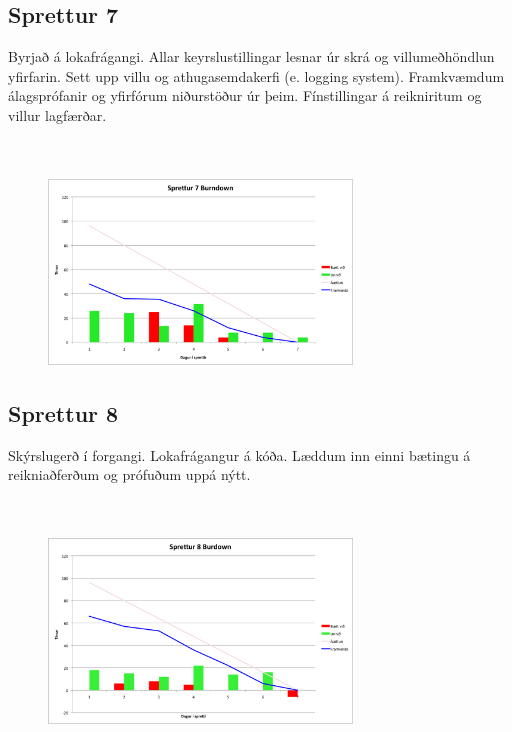 \documentclass{article}
\begin{document}
\subsection{Sprettur 7}
Byrjað á lokafrágangi. Allar keyrslustillingar lesnar úr skrá og villumeðhöndlun
yfirfarin. Sett upp villu og athugasemdakerfi (e. logging system). Framkvæmdum álagsprófanir og 
yfirfórum niðurstöður úr þeim. Fínstillingar á reikniritum og villur lagfærðar. 
\hfil \\
\hfil \\
\hfil \\
\begin{figure}[H]
 \centering
 \includegraphics[width=0.72\textwidth]{Sprettur7_Burndown.png}
 \caption{}
\label{fig:sp7}
\end{figure}
\newpage
\subsection{Sprettur 8}
Skýrslugerð í forgangi. Lokafrágangur á kóða. Læddum inn einni
bætingu á reikniaðferðum og prófuðum uppá nýtt.
\hfil \\
\hfil \\
\hfil \\
\begin{figure}[H]
 \centering
 \includegraphics[width=0.72\textwidth]{Sprettur8_Burndown.png}
 \caption{}
\label{fig:sp8}
\end{figure}
\end{document}
